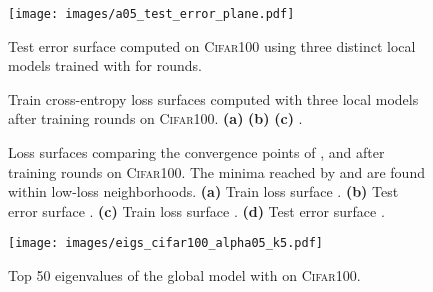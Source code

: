 \begin{figure}
    \centering
    \texttt{[image: images/a05\_test\_error\_plane.pdf]}
    \caption{Test error surface computed on \textsc{Cifar100} using three distinct local models trained with  for  rounds.}
    \label{fig:a05_client_conv}
\end{figure}

\captionsetup[subfloat]{font=scriptsize,labelformat=parens}
\begin{figure}[!t]
    \centering
    \caption{Train cross-entropy loss surfaces computed with three local models after  training rounds on \textsc{Cifar100}. \textbf{(a)}  \textbf{(b)}  \textbf{(c)} .}
    \label{fig:train_loss_plane}
\end{figure}

\begin{figure}[!t]
    \centering
    \caption{Loss surfaces comparing the convergence points of \fedavg, \fedsam and \fedasam after  training rounds on \textsc{Cifar100}. The minima reached by \sam and \asam are found within low-loss neighborhoods. \textbf{(a)} Train loss surface . \textbf{(b)} Test error surface . \textbf{(c)} Train loss surface . \textbf{(d)} Test error surface . }
    \label{fig:convg_algs}
\end{figure}

\begin{figure}[!t]
    \centering
    \texttt{[image: images/eigs\_cifar100\_alpha05\_k5.pdf]}
    \caption{Top 50 eigenvalues of the global model with  on \textsc{Cifar100}.}
    \label{fig:a05_eigs}
\end{figure}


